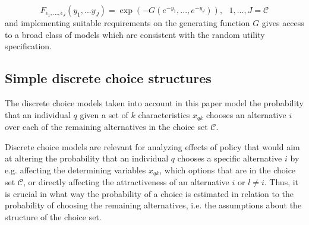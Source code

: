 \begin{equation} \label{eq: epsilon_general}
F_{\epsilon_1,...,\epsilon_J}(y_1, ...y_J) = \exp (-G(e^{-y_1}, ..., e^{-y_J})),\ \ \ 1,...,J=\mathcal{C}
\end{equation}
and implementing suitable requirements on the generating function $G$ gives access to a broad class of models which are consistent with the random utility specification.


\subsection{Simple discrete choice structures}
The discrete choice models taken into account in this paper model the probability that an individual $q$ given a set of $k$ characteristics $x_{qk}$ chooses an alternative $i$ over each of the remaining alternatives in the choice set $\mathcal{C}$.

Discrete choice models are relevant for analyzing effects of policy that would aim at altering the probability that an individual $q$ chooses a specific alternative $i$ by e.g. affecting the determining variables $x_{qk}$, which options that are in the choice set $\mathcal{C}$, or directly affecting the attractiveness of an alternative $i$ or $l \neq i$. Thus, it is crucial in what way the probability of a choice is estimated in relation to the probability of choosing the remaining alternatives, i.e. the assumptions about the structure of the choice set. %


